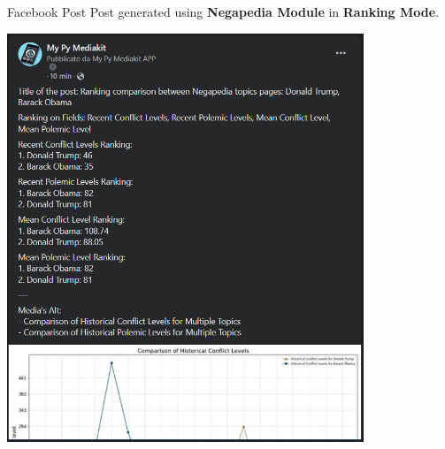 \documentclass{beamer}
\begin{document}
    \begin{frame}{Facebook Post}
        Post generated using \textbf{Negapedia Module} in \textbf{Ranking Mode}.
        \vspace{-0.12cm}
        \begin{center}
            \includegraphics[width=0.8\textwidth, keepaspectratio]{images/facebook_negapedia_ranking_post_screenshot.png}
        \end{center}
    \end{frame}
\end{document}
